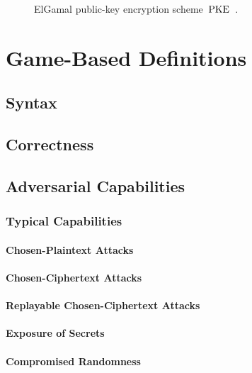 \documentclass[a4paper,orivec]{llncs}
\begin{document}
\begin{figure}[!ht]
    \centering
    \nicoresetlinenr%
    \fbox{%
        \scalebox{\codescalefactor}{%
        }%
    }
    \caption{%
        ElGamal public-key encryption scheme~$\mathrm{PKE}$~\cite{ElGamal85}.
    }
    \label{fig:pke:const:elgamal}
\end{figure}


\section{Game-Based Definitions}

\subsection{Syntax}

\subsection{Correctness}

\subsection{Adversarial Capabilities}

\subsubsection{Typical Capabilities}

\paragraph{Chosen-Plaintext Attacks}

\paragraph{Chosen-Ciphertext Attacks}

\paragraph{Replayable Chosen-Ciphertext Attacks}

\paragraph{Exposure of Secrets}

\paragraph{Compromised Randomness}
\end{document}
